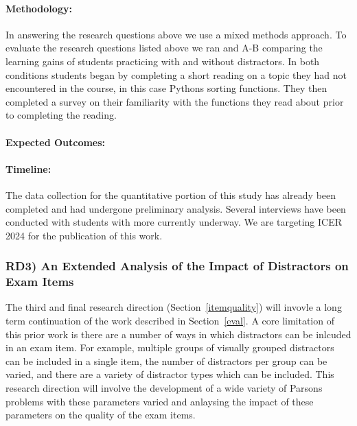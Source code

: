 \documentclass[authorversion,nonacm]{acmart}
\begin{document}
\paragraph{Methodology:} In answering the research questions above we use a mixed 
methods approach.
To evaluate the research questions listed above we ran 
and A-B comparing the learning gains of students practicing with and without distractors.
In both conditions students began by completing a short reading on a topic they had 
not encountered in the course, in this case Pythons sorting functions. They then
completed a survey on their familiarity with the functions they read about prior
to completing the reading. 

\paragraph{Expected Outcomes:} 

\paragraph{Timeline:} The data collection for the quantitative portion of this
study has already been completed and had undergone preliminary analysis. Several 
interviews have been conducted with students with more currently underway. We are 
targeting ICER 2024 for the publication of this work.
 
\subsubsection{RD3) An Extended Analysis of the Impact of Distractors on Exam Items }\label{sec:itemquality}

The third and final research direction (Section~\ref{itemquality}) will
invovle a long term continuation of the work described in Section~\ref{eval}.
A core limitation of this prior work is there are a number of ways in which 
distractors can be inlcuded in an exam item. For example, multiple groups 
of visually grouped distractors can be included in a single item, the number 
of distractors per group can be varied, and there are a variety of distractor 
types which can be included. This research direction will involve the development
of a wide variety of Parsons problems with these parameters varied and anlaysing
the impact of these parameters on the quality of the exam items.
\end{document}
